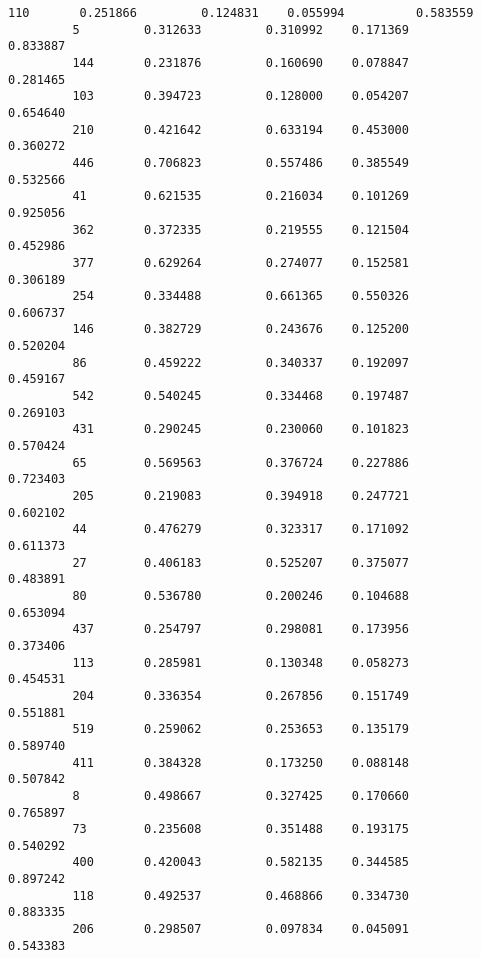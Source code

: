 \documentclass[11pt]{article}
\begin{document}
\begin{Verbatim}[commandchars=\\\{\}]
         110       0.251866         0.124831    0.055994          0.583559   
         5         0.312633         0.310992    0.171369          0.833887   
         144       0.231876         0.160690    0.078847          0.281465   
         103       0.394723         0.128000    0.054207          0.654640   
         210       0.421642         0.633194    0.453000          0.360272   
         446       0.706823         0.557486    0.385549          0.532566   
         41        0.621535         0.216034    0.101269          0.925056   
         362       0.372335         0.219555    0.121504          0.452986   
         377       0.629264         0.274077    0.152581          0.306189   
         254       0.334488         0.661365    0.550326          0.606737   
         146       0.382729         0.243676    0.125200          0.520204   
         86        0.459222         0.340337    0.192097          0.459167   
         542       0.540245         0.334468    0.197487          0.269103   
         431       0.290245         0.230060    0.101823          0.570424   
         65        0.569563         0.376724    0.227886          0.723403   
         205       0.219083         0.394918    0.247721          0.602102   
         44        0.476279         0.323317    0.171092          0.611373   
         27        0.406183         0.525207    0.375077          0.483891   
         80        0.536780         0.200246    0.104688          0.653094   
         437       0.254797         0.298081    0.173956          0.373406   
         113       0.285981         0.130348    0.058273          0.454531   
         204       0.336354         0.267856    0.151749          0.551881   
         519       0.259062         0.253653    0.135179          0.589740   
         411       0.384328         0.173250    0.088148          0.507842   
         8         0.498667         0.327425    0.170660          0.765897   
         73        0.235608         0.351488    0.193175          0.540292   
         400       0.420043         0.582135    0.344585          0.897242   
         118       0.492537         0.468866    0.334730          0.883335   
         206       0.298507         0.097834    0.045091          0.543383   
         

\end{Verbatim}
\end{document}
